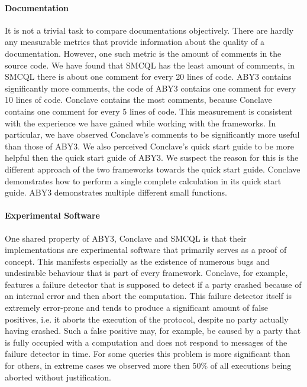 \paragraph{Documentation}
It is not a trivial task to compare documentations objectively. There are hardly any measurable metrics that provide information about the quality of a documentation. However, one such metric is the amount of comments in the source code. We have found that SMCQL has the least amount of comments, in SMCQL there is about one comment for every 20 lines of code. ABY3 contains significantly more comments, the code of ABY3 contains one comment for every 10 lines of code. Conclave contains the most comments, because Conclave contains one comment for every 5 lines of code. This measurement is consistent with the experience we have gained while working with the frameworks. In particular, we have observed Conclave's comments to be significantly more useful than those of ABY3. %
We also perceived Conclave's quick start guide to be more helpful then the quick start guide of ABY3. We suspect the reason for this is the different approach of the two frameworks towards the quick start guide. Conclave demonstrates how to perform a single complete calculation in its quick start guide. ABY3 demonstrates multiple different small functions.  

\paragraph{Experimental Software}
One shared property of ABY3, Conclave and SMCQL is that their implementations are experimental software that primarily serves as a proof of concept. This manifests especially as the existence of numerous bugs and undesirable behaviour that is part of every framework. Conclave, for example, features a failure detector that is supposed to detect if a party crashed because of an  internal error and then abort the computation. This failure detector itself is extremely error-prone and tends to produce a significant amount of false positives, i.e. it aborts the execution of the protocol, despite no party actually having crashed. Such a false positive may, for example, be caused by a party that is fully occupied with a computation and does not respond to messages of the failure detector in time. For some queries this problem is more significant than for others, in extreme cases we observed more then 50\% of all executions being aborted without justification. %



